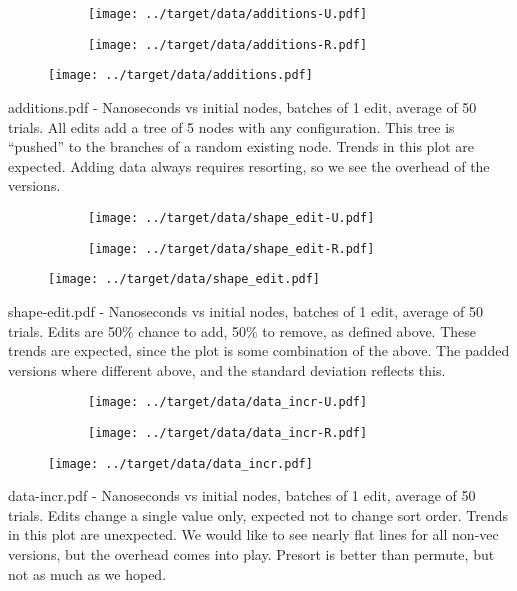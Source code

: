 \documentclass{article}
\begin{document}
\begin{figure}[H]
  \centering
  \begin{subfigure}{.5\textwidth}
    \texttt{[image: ../target/data/additions-U.pdf]}
  \end{subfigure}%
  \begin{subfigure}{.5\textwidth}
    \texttt{[image: ../target/data/additions-R.pdf]}
  \end{subfigure}
  \texttt{[image: ../target/data/additions.pdf]}
\end{figure}
additions.pdf - Nanoseconds vs initial nodes, batches of 1 edit, average of 50 trials. All edits add a tree of 5 nodes with any configuration. This tree is ``pushed'' to the branches of a random existing node. Trends in this plot are expected. Adding data always requires resorting, so we see the overhead of the versions.

\begin{figure}[H]
  \centering
  \begin{subfigure}{.5\textwidth}
    \texttt{[image: ../target/data/shape\_edit-U.pdf]}
  \end{subfigure}%
  \begin{subfigure}{.5\textwidth}
    \texttt{[image: ../target/data/shape\_edit-R.pdf]}
  \end{subfigure}
  \texttt{[image: ../target/data/shape\_edit.pdf]}
\end{figure}
shape-edit.pdf - Nanoseconds vs initial nodes, batches of 1 edit, average of 50 trials. Edits are 50\% chance to add, 50\% to remove, as defined above. These trends are expected, since the plot is some combination of the above. The padded versions where different above, and the standard deviation reflects this. 

\begin{figure}[H]
  \centering
  \begin{subfigure}{.5\textwidth}
    \texttt{[image: ../target/data/data\_incr-U.pdf]}
  \end{subfigure}%
  \begin{subfigure}{.5\textwidth}
    \texttt{[image: ../target/data/data\_incr-R.pdf]}
  \end{subfigure}
  \texttt{[image: ../target/data/data\_incr.pdf]}
\end{figure}
data-incr.pdf - Nanoseconds vs initial nodes, batches of 1 edit, average of 50 trials. Edits change a single value only, expected not to change sort order. Trends in this plot are unexpected. We would like to see nearly flat lines for all non-vec versions, but the overhead comes into play. Presort is better than permute, but not as much as we hoped.
\end{document}
